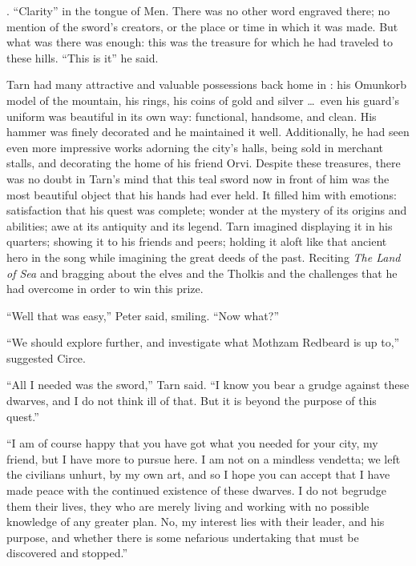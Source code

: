 
\emph{\kildir}.  ``Clarity'' in the tongue of Men.  There was no other word engraved there; no mention of the sword's creators, or the place or time in which it was made.  But what was there was enough: this was the treasure for which he had traveled to these hills.  ``This is it'' he said.

Tarn had many attractive and valuable possessions back home in \korbarthrond: his Omunkorb model of the mountain, his rings, his coins of gold and silver \ldots\ even his guard's uniform was beautiful in its own way: functional, handsome, and clean.  His hammer was finely decorated and he maintained it well.  Additionally, he had seen even more impressive works adorning the city's halls, being sold in merchant stalls, and decorating the home of his friend Orvi.  Despite these treasures, there was no doubt in Tarn's mind that this teal sword now in front of him was the most beautiful object that his hands had ever held.  It filled him with emotions: satisfaction that his quest was complete; wonder at the mystery of its origins and abilities; awe at its antiquity and its legend.  Tarn imagined displaying it in his quarters; showing it to his friends and peers; holding it aloft like that ancient hero in the song while imagining the great deeds of the past.  Reciting \emph{The Land of Sea} and bragging about the elves and the Tholkis and the challenges that he had overcome in order to win this prize.

``Well that was easy,'' Peter said, smiling.  ``Now what?''

``We should explore further, and investigate what Mothzam Redbeard is up to,'' suggested Circe.

``All I needed was the sword,'' Tarn said.  ``I know you bear a grudge against these dwarves, and I do not think ill of that.  But it is beyond the purpose of this quest.''

``I am of course happy that you have got what you needed for your city, my friend, but I have more to pursue here.  I am not on a mindless vendetta; we left the civilians unhurt, by my own art, and so I hope you can accept that I have made peace with the continued existence of these dwarves.  I do not begrudge them their lives, they who are merely living and working with no possible knowledge of any greater plan.  No, my interest lies with their leader, and his purpose, and whether there is some nefarious undertaking that must be discovered and stopped.''

